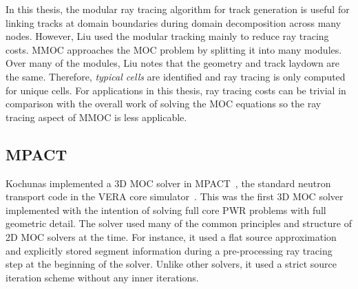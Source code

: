 In this thesis, the modular ray tracing algorithm for track generation is useful for linking tracks at domain boundaries during domain decomposition across many nodes. However, Liu used the modular tracking mainly to reduce ray tracing costs. MMOC approaches the \ac{MOC} problem by splitting it into many modules. Over many of the modules, Liu notes that the geometry and track laydown are the same. Therefore, \textit{typical cells} are identified and ray tracing is only computed for unique cells. For applications in this thesis, ray tracing costs can be trivial in comparison with the overall work of solving the \ac{MOC} equations so the ray tracing aspect of MMOC is less applicable.



\subsection{MPACT}
\label{sec:mpact}

Kochunas implemented a 3D \ac{MOC} solver in MPACT~\cite{mpact_initial, kochunas}, the standard neutron transport code in the VERA core simulator~\cite{vera}.  This was the first 3D \ac{MOC} solver implemented with the intention of solving full core PWR problems with full geometric detail. The solver used many of the common principles and structure of 2D \ac{MOC} solvers at the time. For instance, it used a flat source approximation and explicitly stored segment information during a pre-processing ray tracing step at the beginning of the solver. Unlike other solvers, it used a strict source iteration scheme without any inner iterations. 

